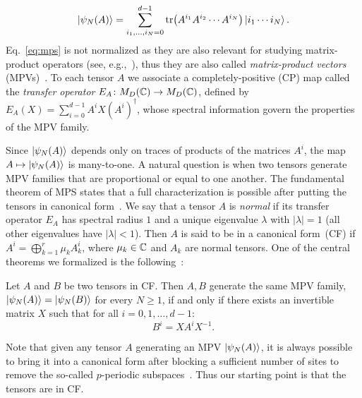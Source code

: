 \documentclass[aps,prl,twocolumn,superscriptaddress,longbibliography,10pt,footinbib]{revtex4-2}
\begin{document}
\begin{equation}\label{eq:mps}
    \ket{\psi_N(A)} = \sum_{i_1,\ldots,i_N=0}^{d-1} \operatorname{tr}\!\left(A^{i_1} A^{i_2} \cdots A^{i_N}\right) \ket{i_1 \cdots i_N}.
\end{equation}
Eq.~\eqref{eq:mps} is not normalized as they are also relevant for studying matrix-product operators (see, e.g.,~\cite{Cirac2017Matrix,Liu2026Parent}), thus they are also called \textit{matrix-product vectors} (MPVs)~\cite{Cirac2017Matrixa}. To each tensor $A$ we associate a completely-positive (CP) map called the \textit{transfer operator} $E_A \colon M_D(\mathbb{C}) \to M_D(\mathbb{C})$, defined by $E_A(X) = \sum_{i=0}^{d-1} A^{i} X {(A^{i})}^\dagger$, whose spectral information govern the properties of the MPV family.

Since $\ket{\psi_N(A)}$ depends only on traces of products of the matrices $A^i$, the map $A \mapsto \ket{\psi_N(A)}$ is many-to-one. A natural question is when two tensors generate MPV families that are proportional or equal to one another. The fundamental theorem of MPS states that a full characterization is possible after putting the tensors in canonical form~\cite{Perez-Garcia2007Matrix,Cirac2017Matrixa}.
We say that a tensor $A$ is \textit{normal} if its transfer operator $E_A$ has spectral radius $1$ and a unique eigenvalue $\lambda$ with $|\lambda|=1$ (all other eigenvalues have $|\lambda|<1$). Then $A$ is said to be in a canonical form~(CF) if $A^i = \bigoplus_{k=1}^r \mu_k A^i_k$, where $\mu_{k}\in\mathbb{C}$ and $A_k$ are normal tensors.
One of the central theorems we formalized is the following~\cite{Perez-Garcia2007Matrix,Cirac2017Matrixa,Cirac2021Matrix}:
\begin{theorem}\label{thm:bnt-equivalence}
    Let $A$ and $B$ be two tensors in CF\@. Then $A,B$ generate the same MPV family, $\ket{\psi_N(A)} = \ket{\psi_N(B)}$ for every $N\geq 1$, if and only if there exists an invertible matrix $X$ such that for all $i=0,1,\ldots,d-1$:
    \begin{equation}
        B^i=X A^i X^{-1}.\label{eq:equal-MPV-tensor}
    \end{equation}
\end{theorem}
\noindent Note that given any tensor $A$ generating an MPV $\ket{\psi_N(A)}$, it is always possible to bring it into a canonical form after blocking a sufficient number of sites to remove the so-called $p$-periodic subspaces~\cite{Cirac2017Matrixa,Fannes1992Finitely}. Thus our starting point is that the tensors are in CF\@.
\end{document}
